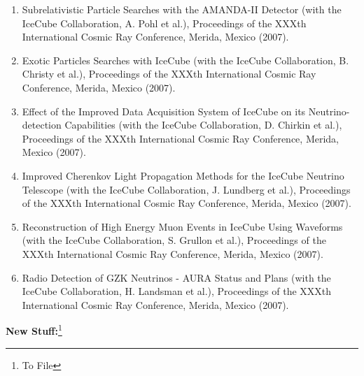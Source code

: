 \begin{enumerate}
\item Subrelativistic Particle Searches with the AMANDA-II Detector
  (with the IceCube Collaboration, A. Pohl et al.), Proceedings of the
  XXXth International Cosmic Ray Conference, Merida, Mexico (2007).

\item Exotic Particles Searches with IceCube (with the IceCube
  Collaboration, B. Christy et al.), Proceedings of the XXXth
  International Cosmic Ray Conference, Merida, Mexico (2007).

\item Effect of the Improved Data Acquisition System of IceCube on its
  Neutrino-detection Capabilities (with the IceCube Collaboration,
  D. Chirkin et al.), Proceedings of the XXXth International Cosmic
  Ray Conference, Merida, Mexico (2007).

\item Improved Cherenkov Light Propagation Methods for the IceCube
  Neutrino Telescope (with the IceCube Collaboration, J. Lundberg et
  al.), Proceedings of the XXXth International Cosmic Ray Conference,
  Merida, Mexico (2007).

\item Reconstruction of High Energy Muon Events in IceCube Using
  Waveforms (with the IceCube Collaboration, S. Grullon et al.),
  Proceedings of the XXXth International Cosmic Ray Conference,
  Merida, Mexico (2007).

\item Radio Detection of GZK Neutrinos - AURA Status and Plans (with
  the IceCube Collaboration, H. Landsman et al.), Proceedings of the
  XXXth International Cosmic Ray Conference, Merida, Mexico (2007).


\end{enumerate}

{\bf New Stuff:}\footnote{To File}
\vspace{0.25cm}

